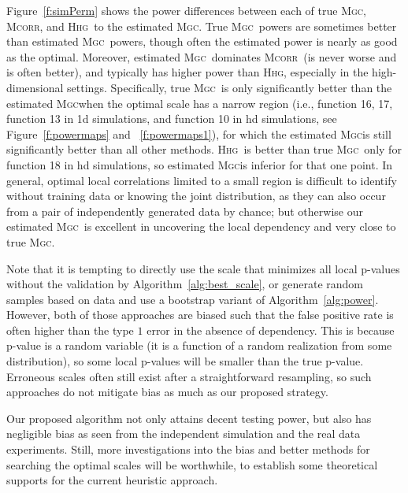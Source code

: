 \documentclass[11pt]{article}
\providecommand{\sct}[1]{{\normalfont\textsc{#1}}}
\newcommand{\Mgc}{\sct{Mgc}}
\newcommand{\Hhg}{\sct{Hhg}}
\newcommand{\Mcorr}{\sct{Mcorr}}
\begin{document}
Figure~\ref{f:simPerm} shows the power differences between each of true \Mgc, \Mcorr, and \Hhg~to the estimated \Mgc. True \Mgc~powers are sometimes better than estimated \Mgc~powers, though often the estimated power is nearly as good as the optimal.  Moreover,  estimated \Mgc~dominates \Mcorr~(is never worse and is often better), and typically has higher power than \Hhg, especially in the high-dimensional settings. Specifically, true \Mgc~is only significantly better than the estimated \Mgc when the optimal scale has a narrow region (i.e., function 16, 17, function 13 in 1d simulations, and function 10 in hd simulations, see Figure~\ref{f:powermaps} and ~\ref{f:powermaps1}), for which the estimated \Mgc is still significantly better than all other methods. \Hhg~is better than true \Mgc~only for function 18 in hd simulations, so estimated \Mgc is inferior for that one point. In general, optimal local correlations limited to a small region is difficult to identify without training data or knowing the joint distribution, as they can also occur from a pair of independently generated data by chance; but otherwise our estimated \Mgc~is excellent in uncovering the local dependency and very close to true \Mgc. 


Note that it is tempting to directly use the scale that minimizes all local p-values without the validation by Algorithm~\ref{alg:best_scale}, or generate random samples based on  data  and use a bootstrap variant of Algorithm~\ref{alg:power}. However, both of those approaches are biased such that the false positive rate is often higher than the type $1$ error in the absence of dependency. This is because p-value is a random variable (it is a function of a random realization from some distribution), so some local p-values will be smaller than the true p-value. 
Erroneous scales often still exist after a straightforward resampling, so such approaches do not mitigate bias as much as our proposed strategy. 

Our proposed algorithm not only attains decent testing power, but also has negligible bias as seen from the independent simulation and the real data experiments.
Still, more investigations into the bias and better methods for searching the optimal scales will be worthwhile, to establish some theoretical supports for the current heuristic approach.
\end{document}

